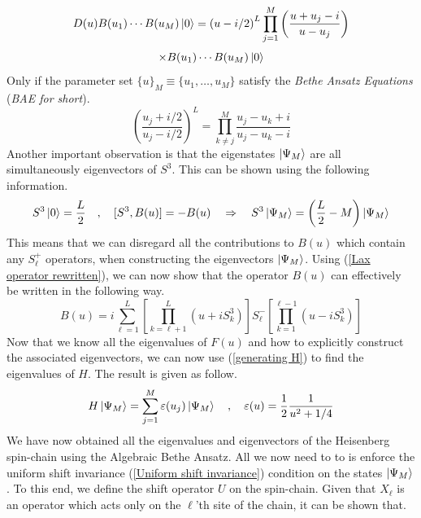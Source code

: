%
%
\begin{equation*}
D(u) B(u_1) \cdots B(u_M) \ket{0}
=
\left( u - i / 2 \right)^L
\prod_{j=1}^M \left( \frac{u + u_j - i}{u - u_j}
\right) 
\end{equation*}
%
%
\begin{equation}
\times B(u_1) \cdots B(u_M) \ket{0}
\end{equation}
%
%
Only if the parameter set $\{ u \}_M \equiv \{ u_1, \ldots , u_M \}$ satisfy the \textit{Bethe Ansatz Equations} (\textit{BAE for short}).
%
%
\begin{equation}
\left(
\frac{u_j + i / 2}{u_j - i / 2}
\right)^L
=
\prod_{k \neq j}^M
\frac{u_j - u_k + i}{u_j - u_k - i}
\end{equation}
%
%
Another important observation is that the eigenstates $\ket{\Psi_M}$ are all simultaneously eigenvectors of $S^3$. This can be shown using the following information.
%
%
\begin{equation}
S^3 \ket{0} = \frac{L}{2}
%
\quad , \quad
%
[S^3, B(u)] = -B(u)
%
\quad \Rightarrow \quad
%
S^3 \ket{\Psi_M} = \left( \frac{L}{2} - M \right) \ket{\Psi_M}
\end{equation}
%
%
This means that we can disregard all the contributions to $B(u)$ which contain any $S_\ell^{+}$ operators, when constructing the eigenvectors $\ket{\Psi_M}$. Using (\ref{Lax operator rewritten}), we can now show that the operator $B(u)$ can effectively be written in the following way.
%
%
\begin{equation}\label{Magnon creation operator}
B(u)
=
i \sum_{\ell=1}^L
\left[
	\prod_{k=\ell+1}^{L}
	\left( u + i S^3_k \right)
\right]
S^{-}_\ell
\left[
	\prod_{k=1}^{\ell-1}
	\left( u - i S^3_k \right)
\right]
\end{equation}
%
%
Now that we know all the eigenvalues of $F(u)$ and how to explicitly construct the associated eigenvectors, we can now use (\ref{generating H}) to find the eigenvalues of $H$. The result is given as follow.
%
%
\begin{equation}
H \ket{\Psi_M} = \sum_{j=1}^M \varepsilon(u_j) \ket{\Psi_M}
%
\quad , \quad
%
\varepsilon(u)
=
\frac{1}{2} \frac{1}{u^2 + 1 / 4}
\end{equation}
%
%
We have now obtained all the eigenvalues and eigenvectors of the Heisenberg spin-chain using the Algebraic Bethe Ansatz. All we now need to to is enforce the uniform shift invariance (\ref{Uniform shift invariance}) condition on the states $\ket{\Psi_M}$. To this end, we define the shift operator $U$ on the spin-chain. Given that $X_\ell$ is an operator which acts only on the $\ell$'th site of the chain, it can be shown that.
